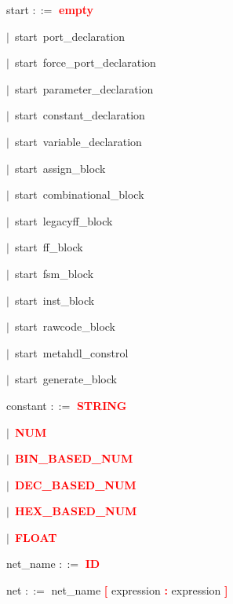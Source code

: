 
\vspace{1em}
\noindent
\settowidth{\parindent}{\hspace{4ex}}
start $::=$\hspace{1ex}  \textbf{\textcolor{red}{empty}}

\mbox{$|$ start port\_declaration}

\mbox{$|$ start force\_port\_declaration}

\mbox{$|$ start parameter\_declaration}

\mbox{$|$ start constant\_declaration}

\mbox{$|$ start variable\_declaration}

\mbox{$|$ start assign\_block}

\mbox{$|$ start combinational\_block}

\mbox{$|$ start legacyff\_block}

\mbox{$|$ start ff\_block}

\mbox{$|$ start fsm\_block}

\mbox{$|$ start inst\_block}

\mbox{$|$ start rawcode\_block}

\mbox{$|$ start metahdl\_constrol}

\mbox{$|$ start generate\_block}

\vspace{1em}
\noindent
\settowidth{\parindent}{\hspace{4ex}}
constant $::=$\hspace{1ex} \textbf{\textcolor{red}{STRING}}

\mbox{$|$ \textbf{\textcolor{red}{NUM}}}

\mbox{$|$ \textbf{\textcolor{red}{BIN\_BASED\_NUM}}}

\mbox{$|$ \textbf{\textcolor{red}{DEC\_BASED\_NUM}}}

\mbox{$|$ \textbf{\textcolor{red}{HEX\_BASED\_NUM}}}

\mbox{$|$ \textbf{\textcolor{red}{FLOAT}}}

\vspace{1em}
\noindent
\settowidth{\parindent}{\hspace{4ex}}
net\_name $::=$\hspace{1ex} \textbf{\textcolor{red}{ID}}

\vspace{1em}
\noindent
\settowidth{\parindent}{\hspace{4ex}}
net $::=$\hspace{1ex} net\_name \textbf{\textcolor{red}{[}} expression \textbf{\textcolor{red}{:}} expression \textbf{\textcolor{red}{]}}

